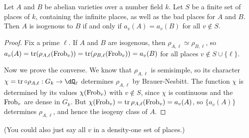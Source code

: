 \begin{theorem}
Let $A$ and $B$ be abelian varieties over a number field $k$. Let $S$ be a
finite set of places of $k$, containing the infinite places, as well as the 
bad places for $A$ and $B$. Then $A$ is isogenous to $B$ if and only if 
$a_v(A)=a_v(B)$ for all $v\notin S$. 
\end{theorem}
\begin{proof}
Fix a prime $\ell$. If $A$ and $B$ are isogenous, then 
$\rho_{A,\ell}\simeq \rho_{B,\ell}$, so 
$a_v(A)=\operatorname{tr}(\rho_{A,\ell}(\mathrm{Frob}_v))=\operatorname{tr}(\rho_{B,\ell}(\mathrm{Frob}_v))=a_v(B)$ 
for all places $v\notin S\cup\{\ell\}$. 

Now we prove the converse. We know that $\rho_{A,\ell}$ is semisimple, so its 
character $\chi=\trace\circ \rho_{A,\ell}:G_k \to \dQ_\ell$ determines 
$\rho_{A,\ell}$ by Brauer-Nesbitt. The function $\chi$ is determined by its 
values $\chi(\mathrm{Frob}_v)$ with $v\notin S$, since $\chi$ is continuous and the 
$\mathrm{Frob}_v$ are dense in $G_k$. But 
$\chi(\mathrm{Frob}_v)=\operatorname{tr} \rho_{A,\ell}(\mathrm{Frob}_v) = a_v(A)$, so $\{a_v(A)\}$ 
determines $\rho_{A,\ell}$, and hence the isogeny class of $A$. 
\end{proof}

(You could also just say all $v$ in a density-one set of places.) 









